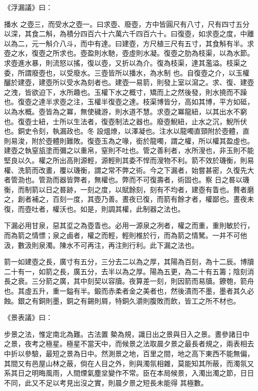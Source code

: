\begin{pinyinscope}
 《浮漏議》曰：



 播水
 之壺三，而受水之壺一。曰求壺、廢壺，方中皆圓尺有八寸，尺有四寸五分以深，其食二斛，為積分四百六十六萬六千四百六十。曰復壺，如求壺之度，中離以為二，元一斛介八斗，而中有達。曰建壺，方尺植三尺有五寸，其食斛有半。求壺之水，復壺之所求也。壺盈則水馳，壺虛則水凝。復壺之肋為枝渠，以為水節。求壺進水暴，則流怒以搖，復以壺，又折以為介。復為枝渠，達其濫溢。枝渠之委，所謂廢壺也，以受廢水。三壺皆所以播水，為水制
 也。自復壺之介，以玉權釃於建壺，建壺所以受水為刻者也。建壺一易箭，則發上室以瀉之。求、復、建壺之洩，皆欲迫下，水所趣也。玉權下水之概寸，矯而上之然後發，則水撓而不躁也。復壺之達半求壺之注，玉權半復壺之達。枝渠博皆分，高如其博，平方如砥，以為水概。壺皆為之冪，無使穢游，則水道不慧。求壺之冪龍紐，以其出水不窮也。復壺士紐，士所以生法者，復壺制法之器也。廢壺鯢紐，止水之沉，鯢所伏也。銅史令刻，執漏政也。冬
 設熅燎，以澤凝也。注水以龍噣直頸附於壺體，直則易浚，附於壺體則難敗。復壺玉為之喙，銜於龍噣，謂之權，所以權其盈虛也。建壺之執窒瓬塗而彌之以重帛，窒則不吐也。管之善利者，水所溲也，非玉則不能堅良以久。權之所出高則源輕，源輕則其委不悍而溲物不利。箭不效於璣衡，則易權、洗箭而改畫，覆以璣衡，謂之常不弊之術。今之下漏者，始嘗甚密，久復先大者管泐也。管泐而器皆弊者，無權也。弊而不可復壽者，術固也。察
 日之晷以璣衡，而制箭以日之晷跡，一刻之度，以賦餘刻，刻有不均者，建壺有眚也。贅者磨之，創者補之，百刻一度，其壺乃善。晝夜已復，而箭有餘才者，權鄙也。晝夜未復，而壺吐者，權沃也。如是，則調其權，此制器之法也。



 下漏必用甘泉，惡其垽之為壺眚也。必用一源泉之冽者，權之而重，重則敏於行，而為箭之情慓；泉之鹵者，權之而輕，輕則椎於行，而為箭之情駑。一井不可他汲，數汲則泉濁。陳水不可再注，再注則行利。此下漏之法也。



 箭一如建壺之長，廣寸有五分，三分去二以為之厚，其陽為百刻，為十二辰。博牘二十有一，如箭之長，廣五分，去半以為之厚。陽為五更，為二十有五籌；陰刻消長之衰。三分箭之廣，其中刻契以容牘。夜算差一刻，則因箭而易牘。鐐匏，箭舟也。其虛五升，重一鎰有半。鍛而赤柔者金之美者也，然後漬而不墨，墨者其久必蝕。銀之有銅則墨，銅之有錫則屑，特銅久灂則腹敗而飲，皆工之所不材也。



 《景表議》曰：



 步景之法，惟定南北為難。古法置
 槷為規，識日出之景與日入之景。晝參諸日中之景，夜考之極星。極星不當天中，而候景之法取晨夕景之最長者規之，兩表相去中折以參驗，最短之景為日中。然測景之地，百里之間，地之高下東西不能無偏，其間又有邑屋山林之蔽，倘在人目之外，則與濁氛相雜，莫能知其所蔽，而濁氛又系其日之明晦風雨，人間煙氣塵坌變作不常。臣在本局候景，入濁出濁之節，日日不同，此又不足以考見出沒之實，則晨夕景之短長未能得
 其極數。




\end{pinyinscope}
